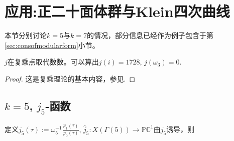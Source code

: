\section{应用:正二十面体群与Klein四次曲线}
本节分别讨论$k=5$与$k=7$的情况，部分信息已经作为例子包含于第\ref{sec:consofmodularform}小节。

\begin{theorem}
	$j$在复乘点取代数数。可以算出$j(i)=1728$, $j(\omega_3)=0$.
\end{theorem}
\begin{proof}
	这是复乘理论的基本内容，参见\cite[6.1]{zagier1984series}.
\end{proof}
\subsection{$k=5$, $j_5$-函数}
定义$j_5(\tau):=\omega_5^{-1} \frac{\varphi_1(\tau)}{\varphi_0(\tau)}$, $\hat{j}_5:X(\Gamma(5)) \longrightarrow \mathbb{PC}^1$由$j_5$诱导，则
